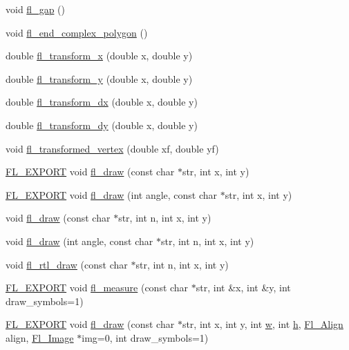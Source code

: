 \begin{DoxyCompactItemize}
void \hyperlink{group__fl__drawings_ga29448f3a419a65645e3f082c65d1df14}{fl\+\_\+gap} ()
\item 
void \hyperlink{group__fl__drawings_gaca7783f2d66b9a65a3201516bfd74694}{fl\+\_\+end\+\_\+complex\+\_\+polygon} ()
\item 
double \hyperlink{group__fl__drawings_gabba2c9a8d7598dca64572a63e592a864}{fl\+\_\+transform\+\_\+x} (double x, double y)
\item 
double \hyperlink{group__fl__drawings_gaf68ee505a886277680f704a86ea7ea86}{fl\+\_\+transform\+\_\+y} (double x, double y)
\item 
double \hyperlink{group__fl__drawings_ga5982191f71657bff8c38e19206869ea8}{fl\+\_\+transform\+\_\+dx} (double x, double y)
\item 
double \hyperlink{group__fl__drawings_ga38e48d06963d55b2a3001f09355824a8}{fl\+\_\+transform\+\_\+dy} (double x, double y)
\item 
void \hyperlink{group__fl__drawings_ga4069ce7f3661ee913869bf71dbb5d5e7}{fl\+\_\+transformed\+\_\+vertex} (double xf, double yf)
\item 
\hyperlink{_fl___export_8_h_aa9ba29a18aee9d738370a06eeb4470fc}{F\+L\+\_\+\+E\+X\+P\+O\+RT} void \hyperlink{group__fl__drawings_gacf054f0c5c5d3ab6caa1e8be3d58ec7e}{fl\+\_\+draw} (const char $\ast$str, int x, int y)
\item 
\hyperlink{_fl___export_8_h_aa9ba29a18aee9d738370a06eeb4470fc}{F\+L\+\_\+\+E\+X\+P\+O\+RT} void \hyperlink{group__fl__drawings_gacf5b5ca37f2f40d7229413d9fc52c875}{fl\+\_\+draw} (int angle, const char $\ast$str, int x, int y)
\item 
void \hyperlink{group__fl__drawings_gae4ac5a0bc231f239e45dc1552b5ee738}{fl\+\_\+draw} (const char $\ast$str, int n, int x, int y)
\item 
void \hyperlink{group__fl__drawings_ga14f28b302c1adf1f6dc76efbd6275a50}{fl\+\_\+draw} (int angle, const char $\ast$str, int n, int x, int y)
\item 
void \hyperlink{group__fl__drawings_ga4ea048fa98815420272fe661f7c0d993}{fl\+\_\+rtl\+\_\+draw} (const char $\ast$str, int n, int x, int y)
\item 
\hyperlink{_fl___export_8_h_aa9ba29a18aee9d738370a06eeb4470fc}{F\+L\+\_\+\+E\+X\+P\+O\+RT} void \hyperlink{group__fl__drawings_gaccd92d0c0521b0aac30dcb856d438dcd}{fl\+\_\+measure} (const char $\ast$str, int \&x, int \&y, int draw\+\_\+symbols=1)
\item 
\hyperlink{_fl___export_8_h_aa9ba29a18aee9d738370a06eeb4470fc}{F\+L\+\_\+\+E\+X\+P\+O\+RT} void \hyperlink{group__fl__drawings_ga0c1fe5be700c7b7079caf5dfd9fde9cd}{fl\+\_\+draw} (const char $\ast$str, int x, int y, int \hyperlink{forms_8_h_aac374e320caaadeca4874add33b62af2}{w}, int \hyperlink{forms_8_h_a7e427ba5b307f9068129699250690066}{h}, \hyperlink{_enumerations_8_h_a44e8bcd1e030e65e4f88cbae64a7c3e3}{Fl\+\_\+\+Align} align, \hyperlink{class_fl___image}{Fl\+\_\+\+Image} $\ast$img=0, int draw\+\_\+symbols=1)

\end{DoxyCompactItemize}
